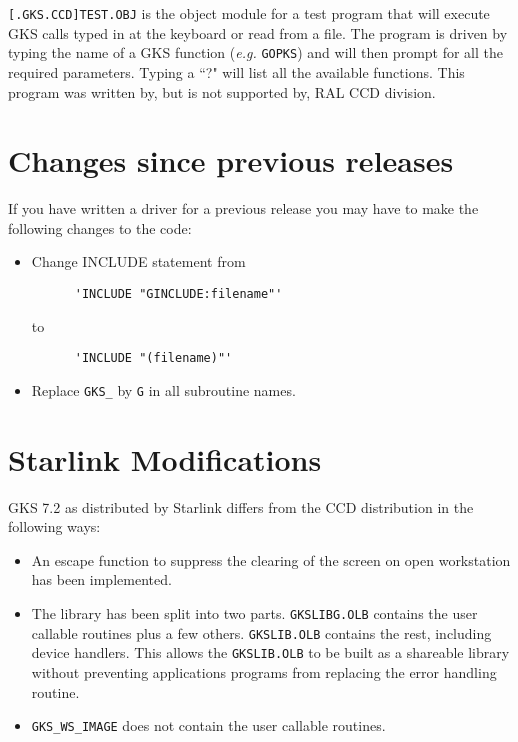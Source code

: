 {\tt [.GKS.CCD]TEST.OBJ} is the object module for a test program that will
execute GKS calls typed in at the keyboard or read from a file. The program is
driven by typing the name of a GKS function ({\em e.g.} {\tt GOPKS}) and will
then prompt for all the required parameters. Typing a ``?" will list all the
available functions. This program was written by, but is not supported by, RAL
CCD division.

\section{Changes since previous releases}

If you have written a driver for a previous release you may have to make the
following changes to the code:

\begin{itemize}

\item Change INCLUDE statement from
\begin{verbatim}
      'INCLUDE "GINCLUDE:filename"'
\end{verbatim}
to
\begin{verbatim}
      'INCLUDE "(filename)"'
\end{verbatim}

\item Replace {\tt GKS\_} by {\tt G} in all subroutine names.

\end{itemize}

\section{Starlink Modifications}

GKS 7.2 as distributed by Starlink differs from the CCD distribution in
the following ways:

\begin{itemize}

\item An escape function to suppress the clearing of the screen on open
workstation has been implemented.

\item The library has been split into two parts. {\tt GKSLIBG.OLB} contains the
user callable routines plus a few others. {\tt GKSLIB.OLB} contains the rest,
including device handlers. This allows the {\tt GKSLIB.OLB} to be built as a
shareable library without preventing applications programs from replacing the
error handling routine.

\item {\tt GKS\_WS\_IMAGE} does not contain the user callable routines.

\end{itemize}

